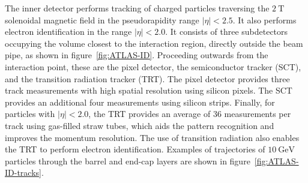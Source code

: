 The inner detector performs tracking of charged particles traversing the $\SI{2}{\tesla}$ solenoidal magnetic field in the pseudorapidity range $|\eta|<2.5$. It also performs electron identification in the range $|\eta|<2.0$. It consists of three subdetectors occupying the volume closest to the interaction region, directly outside the beam pipe, as shown in figure~\ref{fig:ATLAS-ID}. Proceeding outwards from the interaction point, these are the pixel detector, the semiconductor tracker (SCT), and the transition radiation tracker (TRT). The pixel detector provides three track measurements with high spatial resolution using silicon pixels. The SCT provides an additional four measurements using silicon strips. Finally, for particles with $|\eta|<2.0$, the TRT provides an average of 36 measurements per track using gas-filled straw tubes, which aids the pattern recognition and improves the momentum resolution. The use of transition radiation also enables the TRT to perform electron identification. Examples of trajectories of $\SI{10}{\giga\electronvolt}$ particles through the barrel and end-cap layers are shown in figure~\ref{fig:ATLAS-ID-tracks}.

